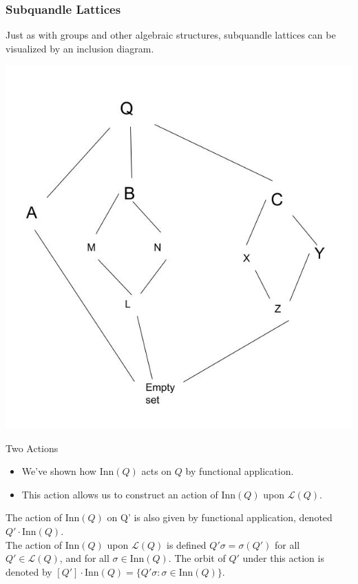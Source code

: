 \documentclass[10pt]{beamer}
\newcommand{\Inn}{\mathrm{Inn}} %
\theoremstyle{plain}
\begin{document}
    \begin{frame}
        \frametitle{Subquandle Lattices}
        Just as with groups and other algebraic structures, subquandle lattices can be visualized by an inclusion diagram. 
        
        \includegraphics[scale = 0.2]{figures/sqlattice.jpg}
    \end{frame}
    
\begin{frame}{Two Actions}

    \begin{itemize}
        \item We've shown how $\Inn(Q)$ acts on $Q$ by functional application.
        \item This action allows us to construct an action of $\Inn(Q)$ upon $\mathcal{L}(Q)$.
    \end{itemize}
    
    \vspace{0.5cm}
    \begin{definition}
    The action of $\Inn (Q)$ on Q' is also given by functional application, denoted $Q'\cdot \Inn(Q)$. \\
    \vspace{0.15in}
    The action of $\Inn(Q)$ upon $\mathcal{L}(Q)$ is defined $Q'\sigma = \sigma(Q')$ for all $Q'\in \mathcal{L}(Q)$, and for all $\sigma\in \Inn(Q)$.
    The orbit of $Q'$ under this action is denoted by $[Q']\cdot \Inn(Q) = \{ Q'\sigma: \sigma \in \Inn(Q)\}$.\\
    \end{definition}
    \end{frame}
\end{document}
